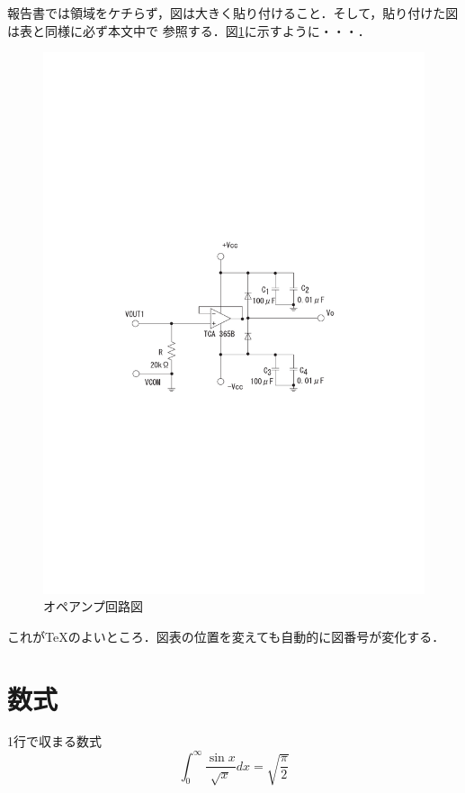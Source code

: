 報告書では領域をケチらず，図は大きく貼り付けること．そして，貼り付けた図は表と同様に必ず本文中で
参照する．図\ref{amp}に示すように・・・．
\begin{figure}[htbp]
 \begin{center}
  \includegraphics[width = 14.0cm]{./fig/drive_circuit.pdf}
 \end{center}
 \caption{オペアンプ回路図}
 \label{amp}
\end{figure}

これが\TeX のよいところ．図表の位置を変えても自動的に図番号が変化する．

\section{数式}
1行で収まる数式
\begin{equation}
 \int_0^\infty \frac{\sin x}{\sqrt{x}} dx = \sqrt{\frac{\pi}{2}}\label{eq1}
\end{equation}

